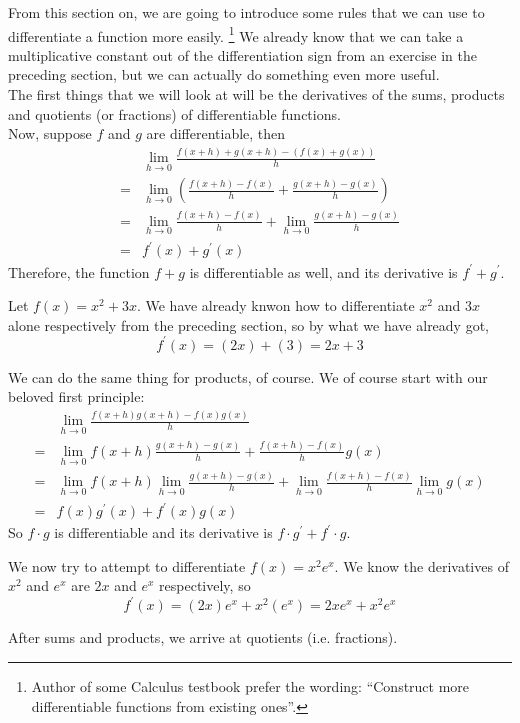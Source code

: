 From this section on, we are going to introduce some rules that we can use to differentiate a function more easily.
\footnote{Author of some Calculus testbook prefer the wording: ``Construct more differentiable functions from existing ones''.}
We already know that we can take a multiplicative constant out of the differentiation sign from an exercise in the preceding section, but we can actually do something even more useful.\\
The first things that we will look at will be the derivatives of the sums, products and quotients (or fractions) of differentiable functions.\\
Now, suppose $f$ and $g$ are differentiable, then
\begin{align*}
    &\lim_{h\to0}\frac{f(x+h)+g(x+h)-(f(x)+g(x))}{h}\\
    =&\lim_{h\to0}(\frac{f(x+h)-f(x)}{h}+\frac{g(x+h)-g(x)}{h})\\
    =&\lim_{h\to0}\frac{f(x+h)-f(x)}{h}+\lim_{h\to0}\frac{g(x+h)-g(x)}{h}\\
    =&f^\prime(x)+g^\prime(x)
\end{align*}
Therefore, the function $f+g$ is differentiable as well, and its derivative is $f^\prime+g^\prime$.
\begin{example}
    Let $f(x)=x^2+3x$. We have already knwon how to differentiate $x^2$ and $3x$ alone respectively from the preceding section, so by what we have already got,
    $$f^\prime(x)=(2x)+(3)=2x+3$$
\end{example}
We can do the same thing for products, of course. We of course start with our beloved first principle:
\begin{align*}
    &\lim_{h\to0}\frac{f(x+h)g(x+h)-f(x)g(x)}{h}\\
    =&\lim_{h\to0}f(x+h)\frac{g(x+h)-g(x)}{h}+\frac{f(x+h)-f(x)}{h}g(x)\\
    =&\lim_{h\to0}f(x+h)\lim_{h\to0}\frac{g(x+h)-g(x)}{h}+\lim_{h\to0}\frac{f(x+h)-f(x)}{h}\lim_{h\to0}g(x)\\
    =&f(x)g^\prime(x)+f^\prime(x)g(x)
\end{align*}
So $f\cdot g$ is differentiable and its derivative is $f\cdot g^\prime+f^\prime\cdot g$.
\begin{example}
    We now try to attempt to differentiate $f(x)=x^2e^x$. We know the derivatives of $x^2$ and $e^x$ are $2x$ and $e^x$ respectively, so
    $$f^\prime(x)=(2x)e^x+x^2(e^x)=2xe^x+x^2e^x$$
\end{example}
After sums and products, we arrive at quotients (i.e. fractions).

